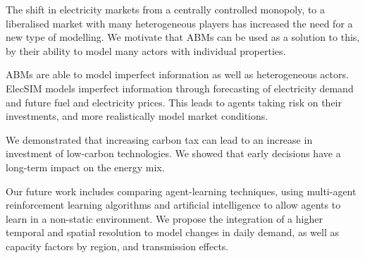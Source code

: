 
The shift in electricity markets from a centrally controlled monopoly, to a liberalised market with many heterogeneous players has increased the need for a new type of modelling. We motivate that ABMs can be used as a solution to this, by their ability to model many actors with individual properties. 

ABMs are able to model imperfect information as well as heterogeneous actors. ElecSIM models imperfect information through forecasting of electricity demand and future fuel and electricity prices. This leads to agents taking risk on their investments, and more realistically model market conditions.

We demonstrated that increasing carbon tax can lead to an increase in investment of low-carbon technologies. We showed that early decisions have a long-term impact on the energy mix. 

Our future work includes comparing agent-learning techniques, using multi-agent reinforcement learning algorithms and artificial intelligence to allow agents to learn in a non-static environment. We propose the integration of a higher temporal and spatial resolution to model changes in daily demand, as well as capacity factors by region, and transmission effects.


\FloatBarrier
